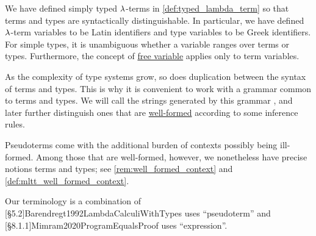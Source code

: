 \begin{concept}\label{con:pseudoterm_expression}\mimprovised
  We have defined simply typed \( {\mathrm \lambda} \)-terms in \cref{def:typed_lambda_term} so that terms and types are syntactically distinguishable. In particular, we have defined \( {\mathrm \lambda} \)-term variables to be Latin identifiers and type variables to be Greek identifiers. For simple types, it is unambiguous whether a variable ranges over terms or types. Furthermore, the concept of \hyperref[con:variable_binding]{free variable} applies only to term variables.

  As the complexity of type systems grow, so does duplication between the syntax of terms and types. This is why it is convenient to work with a grammar common to terms and types. We will call the strings generated by this grammar , and later further distinguish ones that are \hyperref[rem:well_formed_context]{well-formed} according to some inference rules.
\end{concept}
\begin{comments}
  \item Pseudoterms come with the additional burden of contexts possibly being ill-formed. Among those that are well-formed, however, we nonetheless have precise notions terms and types; see \cref{rem:well_formed_context} and \cref{def:mltt_well_formed_context}.

  \item Our terminology is a combination of [\S 5.2]{Barendregt1992LambdaCalculiWithTypes} uses \enquote{pseudoterm} and [\S 8.1.1]{Mimram2020ProgramEqualsProof} uses \enquote{expression}.
\end{comments}


